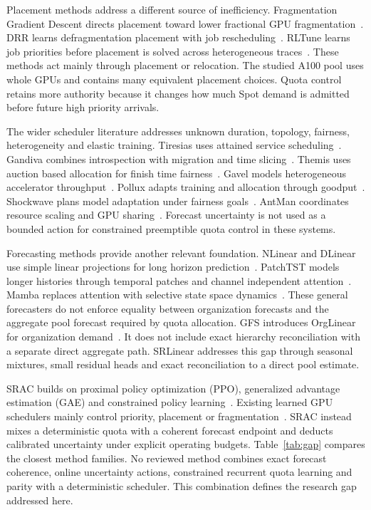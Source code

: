\documentclass[conference]{IEEEtran}
\begin{document}
Placement methods address a different source of inefficiency. Fragmentation Gradient Descent directs placement toward lower fractional GPU fragmentation~\cite{fgd}. DRR learns defragmentation placement with job rescheduling~\cite{drr}. RLTune learns job priorities before placement is solved across heterogeneous traces~\cite{rltune}. These methods act mainly through placement or relocation. The studied A100 pool uses whole GPUs and contains many equivalent placement choices. Quota control retains more authority because it changes how much Spot demand is admitted before future high priority arrivals.

The wider scheduler literature addresses unknown duration, topology, fairness, heterogeneity and elastic training. Tiresias uses attained service scheduling~\cite{tiresias}. Gandiva combines introspection with migration and time slicing~\cite{gandiva}. Themis uses auction based allocation for finish time fairness~\cite{themis}. Gavel models heterogeneous accelerator throughput~\cite{gavel}. Pollux adapts training and allocation through goodput~\cite{pollux}. Shockwave plans model adaptation under fairness goals~\cite{shockwave}. AntMan coordinates resource scaling and GPU sharing~\cite{antman}. Forecast uncertainty is not used as a bounded action for constrained preemptible quota control in these systems.

Forecasting methods provide another relevant foundation. NLinear and DLinear use simple linear projections for long horizon prediction~\cite{dlinear}. PatchTST models longer histories through temporal patches and channel independent attention~\cite{patchtst}. Mamba replaces attention with selective state space dynamics~\cite{mamba}. These general forecasters do not enforce equality between organization forecasts and the aggregate pool forecast required by quota allocation. GFS introduces OrgLinear for organization demand~\cite{gfs}. It does not include exact hierarchy reconciliation with a separate direct aggregate path. SRLinear addresses this gap through seasonal mixtures, small residual heads and exact reconciliation to a direct pool estimate.

SRAC builds on proximal policy optimization (PPO), generalized advantage estimation (GAE) and constrained policy learning~\cite{ppo,gae,cpo}. Existing learned GPU schedulers mainly control priority, placement or fragmentation~\cite{rltune,drr}. SRAC instead mixes a deterministic quota with a coherent forecast endpoint and deducts calibrated uncertainty under explicit operating budgets. Table~\ref{tab:gap} compares the closest method families. No reviewed method combines exact forecast coherence, online uncertainty actions, constrained recurrent quota learning and parity with a deterministic scheduler. This combination defines the research gap addressed here.
\end{document}
